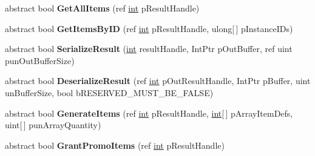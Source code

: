 \begin{DoxyCompactItemize}
\item 
\hypertarget{classValve_1_1Steamworks_1_1ISteamInventory_a291f8f29df629f31eaf885ce8835f664}{}abstract bool {\bfseries Get\+All\+Items} (ref \hyperlink{SDL__thread_8h_a6a64f9be4433e4de6e2f2f548cf3c08e}{int} p\+Result\+Handle)\label{classValve_1_1Steamworks_1_1ISteamInventory_a291f8f29df629f31eaf885ce8835f664}

\item 
\hypertarget{classValve_1_1Steamworks_1_1ISteamInventory_a029cc1eeb474203a35441de0bebe8e73}{}abstract bool {\bfseries Get\+Items\+By\+I\+D} (ref \hyperlink{SDL__thread_8h_a6a64f9be4433e4de6e2f2f548cf3c08e}{int} p\+Result\+Handle, ulong\mbox{[}$\,$\mbox{]} p\+Instance\+I\+Ds)\label{classValve_1_1Steamworks_1_1ISteamInventory_a029cc1eeb474203a35441de0bebe8e73}

\item 
\hypertarget{classValve_1_1Steamworks_1_1ISteamInventory_a04372cad5c10418482108963e8bfbcbb}{}abstract bool {\bfseries Serialize\+Result} (\hyperlink{SDL__thread_8h_a6a64f9be4433e4de6e2f2f548cf3c08e}{int} result\+Handle, Int\+Ptr p\+Out\+Buffer, ref uint pun\+Out\+Buffer\+Size)\label{classValve_1_1Steamworks_1_1ISteamInventory_a04372cad5c10418482108963e8bfbcbb}

\item 
\hypertarget{classValve_1_1Steamworks_1_1ISteamInventory_a564b0e694f5893ce6909bada77fa7396}{}abstract bool {\bfseries Deserialize\+Result} (ref \hyperlink{SDL__thread_8h_a6a64f9be4433e4de6e2f2f548cf3c08e}{int} p\+Out\+Result\+Handle, Int\+Ptr p\+Buffer, uint un\+Buffer\+Size, bool b\+R\+E\+S\+E\+R\+V\+E\+D\+\_\+\+M\+U\+S\+T\+\_\+\+B\+E\+\_\+\+F\+A\+L\+S\+E)\label{classValve_1_1Steamworks_1_1ISteamInventory_a564b0e694f5893ce6909bada77fa7396}

\item 
\hypertarget{classValve_1_1Steamworks_1_1ISteamInventory_abd7ad5fb853eb11443b5d4a0f37f08cc}{}abstract bool {\bfseries Generate\+Items} (ref \hyperlink{SDL__thread_8h_a6a64f9be4433e4de6e2f2f548cf3c08e}{int} p\+Result\+Handle, \hyperlink{SDL__thread_8h_a6a64f9be4433e4de6e2f2f548cf3c08e}{int}\mbox{[}$\,$\mbox{]} p\+Array\+Item\+Defs, uint\mbox{[}$\,$\mbox{]} pun\+Array\+Quantity)\label{classValve_1_1Steamworks_1_1ISteamInventory_abd7ad5fb853eb11443b5d4a0f37f08cc}

\item 
\hypertarget{classValve_1_1Steamworks_1_1ISteamInventory_a7ad0b246a8de397929482a982bcb47ee}{}abstract bool {\bfseries Grant\+Promo\+Items} (ref \hyperlink{SDL__thread_8h_a6a64f9be4433e4de6e2f2f548cf3c08e}{int} p\+Result\+Handle)\label{classValve_1_1Steamworks_1_1ISteamInventory_a7ad0b246a8de397929482a982bcb47ee}


\end{DoxyCompactItemize}
